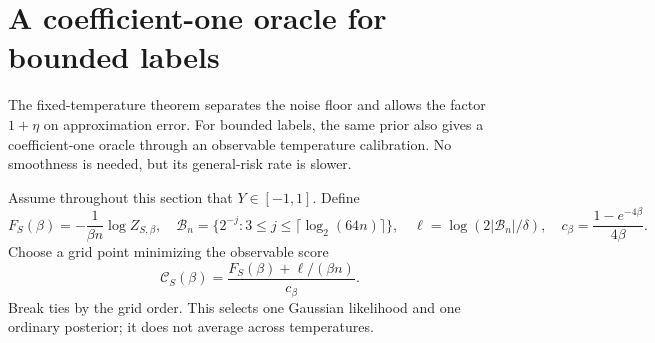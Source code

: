 \section{A coefficient-one oracle for bounded labels}
\label{sec:calibrated}
The fixed-temperature theorem separates the noise floor and allows the factor $1+\eta$ on approximation error. For bounded labels, the same prior also gives a coefficient-one oracle through an observable temperature calibration. No smoothness is needed, but its general-risk rate is slower.

Assume throughout this section that $Y\in[-1,1]$. Define
\[
 F_S(\beta)=-\frac1{\beta n}\log Z_{S,\beta},\quad
 \mathcal B_n=\{2^{-j}:3\le j\le\lceil\log_2(64n)\rceil\},\quad
 \ell=\log(2|\mathcal B_n|/\delta),\quad
 c_\beta=\frac{1-e^{-4\beta}}{4\beta}.
\]
Choose a grid point minimizing the observable score
\begin{equation}
 \mathcal C_S(\beta)=\frac{F_S(\beta)+\ell/(\beta n)}{c_\beta}.
 \label{eq:calibrated-score}
\end{equation}
Break ties by the grid order. This selects one Gaussian likelihood and one ordinary posterior; it does not average across temperatures.

